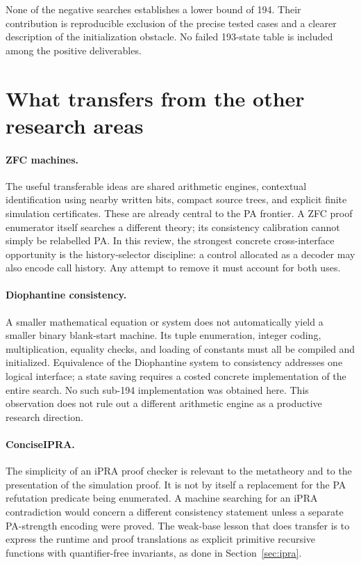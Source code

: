 \documentclass[11pt,a4paper]{article}
\begin{document}
None of the negative searches establishes a lower bound of 194. Their
contribution is reproducible exclusion of the precise tested cases and a
clearer description of the initialization obstacle. No failed 193-state
table is included among the positive deliverables.

\section{What transfers from the other research areas}
\label{sec:alternatives}

\paragraph{ZFC machines.}
The useful transferable ideas are shared arithmetic engines, contextual
identification using nearby written bits, compact source trees, and
explicit finite simulation certificates. These are already central to the
PA frontier. A ZFC proof enumerator itself searches a different theory;
its consistency calibration cannot simply be relabelled PA. In this
review, the strongest concrete cross-interface opportunity is the
history-selector discipline: a control allocated as a decoder may also
encode call history. Any attempt to remove it must account for both uses.

\paragraph{Diophantine consistency.}
A smaller mathematical equation or system does not automatically yield a
smaller binary blank-start machine. Its tuple enumeration, integer coding,
multiplication, equality checks, and loading of constants must all be
compiled and initialized. Equivalence of the Diophantine system to
consistency addresses one logical interface; a state saving requires a
costed concrete implementation of the entire search. No such sub-194
implementation was obtained here. This observation does not rule out a
different arithmetic engine as a productive research direction.

\paragraph{ConciseIPRA.}
The simplicity of an iPRA proof checker is relevant to the metatheory and
to the presentation of the simulation proof. It is not by itself a
replacement for the PA refutation predicate being enumerated. A machine
searching for an iPRA contradiction would concern a different consistency
statement unless a separate PA-strength encoding were proved. The weak-base
lesson that does transfer is to express the runtime and proof translations
as explicit primitive recursive functions with quantifier-free invariants,
as done in Section~\ref{sec:ipra}.
\end{document}
